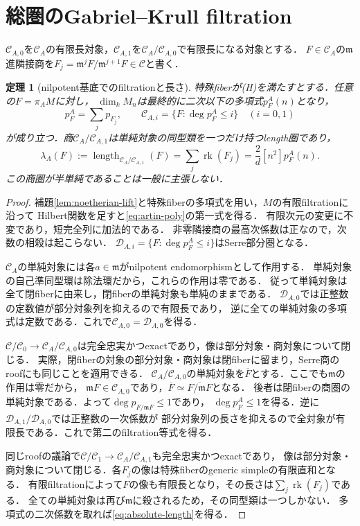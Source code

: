 \documentclass[11pt,a4paper]{ltjsarticle}
\newtheorem{theorem}{定理}[section]
\theoremstyle{definition}
\newcommand{\CC}{\mathcal C}
\newcommand{\DD}{\mathcal D}
\newcommand{\mm}{\mathfrak m}
\newcommand{\rk}{\operatorname{rk}}
\newcommand{\len}{\operatorname{length}}
\begin{document}
\section{総圏のGabriel--Krull filtration}\label{sec:nilpotent}
$\CC_{A,0}$を$\CC_A$の有限長対象，$\CC_{A,1}$を$\CC_A/\CC_{A,0}$で有限長になる対象とする．
$F\in\CC_A$の$\mm$進隣接商を$F_j=\mm^jF/\mm^{j+1}F\in\CC$と書く．

\begin{theorem}[nilpotent基底でのfiltrationと長さ]\label{thm:artin-rank}
特殊fiberが\textup{(H)}を満たすとする．任意の$F=\pi_A M$に対し，
$\dim_k M_n$は最終的に二次以下の多項式$p_F^A(n)$となり，
\begin{equation}\label{eq:artin-poly}
 p_F^A=\sum_jp_{F_j},\qquad
 \CC_{A,i}=\{F:\deg p_F^A\leq i\}\quad(i=0,1)
\end{equation}
が成り立つ．商$\CC_A/\CC_{A,1}$は単純対象の同型類を一つだけ持つlength圏であり，
\begin{equation}\label{eq:absolute-length}
 \lambda_A(F):=\len_{\CC_A/\CC_{A,1}}(F)
 =\sum_j\rk(F_j)=\frac2d[n^2]p_F^A(n).
\end{equation}
この商圏が半単純であることは一般に主張しない．
\end{theorem}
\begin{proof}
補題\ref{lem:noetherian-lift}と特殊fiberの多項式を用い，$M$の有限filtrationに沿って
Hilbert関数を足すと\eqref{eq:artin-poly}の第一式を得る．
有限次元の変更に不変であり，短完全列に加法的である．
非零隣接商の最高次係数は正なので，次数の相殺は起こらない．
$\DD_{A,i}=\{F:\deg p_F^A\leq i\}$はSerre部分圏となる．

$\CC_A$の単純対象には各$a\in\mm$がnilpotent endomorphismとして作用する．
単純対象の自己準同型環は除法環だから，これらの作用は零である．
従って単純対象は全て閉fiberに由来し，閉fiberの単純対象も単純のままである．
$\DD_{A,0}$では正整数の定数値が部分対象列を抑えるので有限長であり，
逆に全ての単純対象の多項式は定数である．これで$\CC_{A,0}=\DD_{A,0}$を得る．

$\CC/\CC_0\to\CC_A/\CC_{A,0}$は完全忠実かつexactであり，像は部分対象・商対象について閉じる．
実際，閉fiberの対象の部分対象・商対象は閉fiberに留まり，Serre商のroofにも同じことを適用できる．
$\CC_A/\CC_{A,0}$の単純対象を$\overline F$とする．ここでも$\mm$の作用は零だから，
$\mm F\in\CC_{A,0}$であり，$\overline F\simeq\overline{F/\mm F}$となる．
後者は閉fiberの商圏の単純対象である．よって$\deg p_{F/\mm F}\leq1$であり，
$\deg p_F^A\leq1$を得る．逆に$\DD_{A,1}/\DD_{A,0}$では正整数の一次係数が
部分対象列の長さを抑えるので全対象が有限長である．これで第二のfiltration等式を得る．

同じroofの議論で$\CC/\CC_1\to\CC_A/\CC_{A,1}$も完全忠実かつexactであり，
像は部分対象・商対象について閉じる．各$F_j$の像は特殊fiberのgeneric simpleの有限直和となる．
有限filtrationによって$F$の像も有限長となり，その長さは$\sum_j\rk(F_j)$である．
全ての単純対象は再び$\mm$に殺されるため，その同型類は一つしかない．
多項式の二次係数を取れば\eqref{eq:absolute-length}を得る．
\end{proof}
\end{document}
